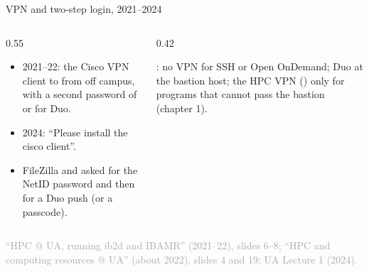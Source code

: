 \documentclass[aspectratio=169,11pt]{beamer}
\newcommand{\sourcecredit}[1]{\vfill\begin{flushright}\tiny\textcolor{DarkGray}{#1}\end{flushright}}
\begin{document}
\begin{frame}{VPN and two-step login, 2021--2024}
\label{fr:uavpn}
\begin{columns}[T,onlytextwidth]
\begin{column}{0.55\textwidth}
\small
\begin{itemize}\setlength{\itemsep}{3pt}
  \item 2021--22: the Cisco VPN client to  from off campus, with a second password of  or  for Duo.
  \item 2024: ``Please install the cisco client''.
  \item FileZilla and  asked for the NetID password and then  for a Duo push (or a passcode).
\end{itemize}
\end{column}
\begin{column}{0.42\textwidth}
\begin{punchbox}
\small {}: no VPN for SSH or Open OnDemand; Duo at the bastion host; the HPC VPN () only for programs that cannot pass the bastion (chapter 1).
\end{punchbox}
\end{column}
\end{columns}
\sourcecredit{``HPC @ UA, running ib2d and IBAMR'' (2021--22), slides 6--8; ``HPC and computing resources @ UA'' (about 2022), slides 4 and 19; UA Lecture 1 (2024).}
\end{frame}
\end{document}
